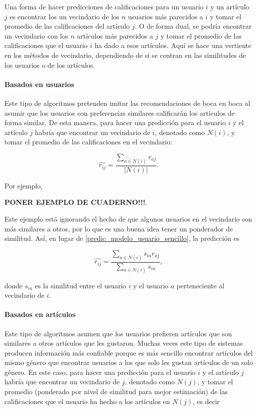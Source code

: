 Una forma de hacer predicciones de calificaciones para un usuario $i$ y un artículo $j$ es encontrar los un vecindario de los $n$ usuarios más parecidos a $i$ y tomar el promedio de las calificaciones del artículo $j$. O de forma dual, se podría encontrar un vecindario con los $n$ artículos más parecidos a $j$ y tomar el promedio de las calificaciones que el usuario $i$ ha dado a esos artículos. Aquí se hace una vertiente en los métodos de vecindario, dependiendo de si se centran en las similitudes de los usuarios o de los artículos.

\paragraph{Basados en usuarios}

Este tipo de algoritmos pretenden imitar las recomendaciones de boca en boca al asumir que los usuarios con preferencias similares calificarán los artículos de forma similar. De esta manera, para hacer una predicción para el usuario $i$ y el artículo $j$ habría que encontrar un vecindario de $i$, denotado como $N(i)$, y tomar el promedio de las calificaciones en el vecindario:

\begin{equation}\label{predic_modelo_usuario_sencillo}
 \hat{r_{ij}} = \frac{\sum_{a \in N(i)} r_{aj}}{\vert N(i) \vert}.
\end{equation}

Por ejemplo,

\textbf{PONER EJEMPLO DE CUADERNO!!!}.

Este ejemplo está ignorando el hecho de que algunos usuarios en el vecindario son más similares a otros, por lo que es una buena idea tener un ponderador de similitud. Así, en lugar de \ref{predic_modelo_usuario_sencillo}, la predicción es

\begin{equation}\label{predic_modelo_usuario_ponderado}
 \hat{r_{ij}} = \frac{\sum_{a \in N(i)} s_{ia} r_{aj}}{\sum_{a \in N(i)} s_{ia}},
\end{equation}

donde $s_{ia}$ es la similitud entre el usuario $i$ y el usuario $a$ perteneciente al vecindario de $i$.

\paragraph{Basados en artículos}

Este tipo de algoritmos asumen que los usuarios prefieren artículos que son similares a otros artículos que les gustaron. Muchas veces este tipo de sistemas producen información más confiable porque es más sencillo encontrar artículos del mismo género que encontrar usuarios a los que solo les gustan artículos de un solo género. En este caso, para hacer una predicción para el usuario $i$ y el artículo $j$ habría que encontrar un vecindario de $j$, denotado como $N(j)$, y tomar el promedio (ponderado por nivel de similitud para mejor estimación) de las calificaciones que el usuario ha hecho a los artículos en $N(j)$, es decir


